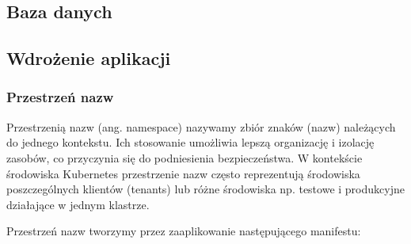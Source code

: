 \subsection{Baza danych}


\subsection{Wdrożenie aplikacji}

\subsubsection{Przestrzeń nazw}

Przestrzenią nazw (ang. namespace) nazywamy zbiór znaków (nazw) należących do jednego kontekstu.
Ich stosowanie umożliwia lepszą organizację i izolację zasobów, co przyczynia się do podniesienia bezpieczeństwa.
W kontekście środowiska Kubernetes przestrzenie nazw często reprezentują środowiska poszczególnych klientów (tenants) lub różne środowiska np. testowe i produkcyjne działające w jednym klastrze.

Przestrzeń nazw tworzymy przez zaaplikowanie następującego manifestu:
\begin{figure}[H]
    \inputminted{yaml}{code/store-namespace.yaml}
    \label{fig:store-namespace}
\end{figure}